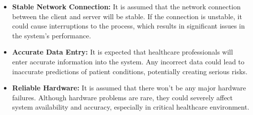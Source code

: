 \documentclass{article}
\begin{document}
\begin{itemize}
    \item \textbf{Stable Network Connection:} It is assumed that the network connection between the client and server will be stable. If the connection is unstable, it could cause interruptions to the process, which results in significant issues in the system’s performance.
    
    \item \textbf{Accurate Data Entry:} It is expected that healthcare professionals will enter accurate information into the system. Any incorrect data could lead to inaccurate predictions of patient conditions, potentially creating serious risks.
    
    \item \textbf{Reliable Hardware:} It is assumed that there won’t be any major hardware failures. Although hardware problems are rare, they could severely affect system availability and accuracy, especially in critical healthcare environment.
    
\end{itemize}
\end{document}
